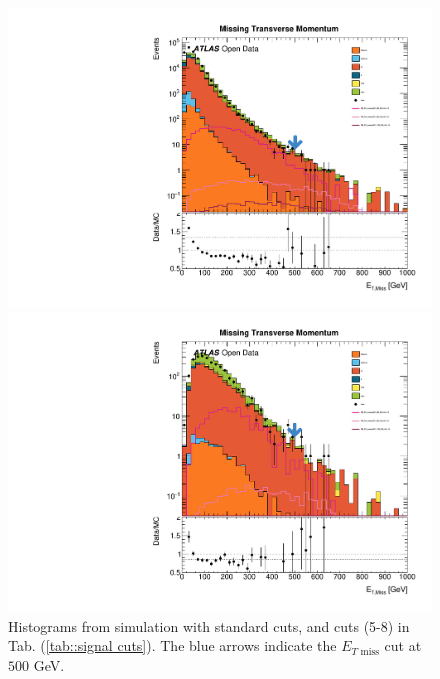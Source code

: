 \documentclass[11pt]{article}
\begin{document}
\begin{figure}[H]
\centering

\begin{minipage}{.5\textwidth}
  \centering
  \includegraphics[width=1.\linewidth]{plots/Standard_Cut/cropped_etmiss_edited.pdf}
\end{minipage}%
\begin{minipage}{.5\textwidth}
  \centering
  \includegraphics[width=1.\linewidth]{plots/Consider_etmiss_mt150/cropped_etmiss-1_edited.pdf}
\end{minipage}

\caption{Histograms from simulation with standard cuts, and cuts (5-8) in Tab. (\ref{tab::signal cuts}). The blue arrows indicate the $E_{T \text{ miss}}$ cut at $500$ GeV.}
\label{fig:: etmiss hist}
\end{figure}
\end{document}
